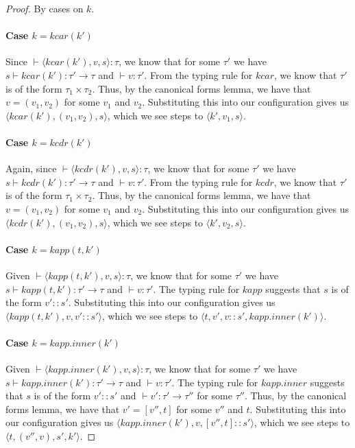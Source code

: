\documentclass{article}
\begin{document}
\begin{proof}
  By cases on $k$.

  \paragraph{Case $k = \mathit{kcar}(k')$} Since $\vdash \langle
  \mathit{kcar}(k'), v, s \rangle : \tau$, we know that for some
  $\tau'$ we have $s \vdash \mathit{kcar}(k') : \tau' \rightarrow
  \tau$ and $\vdash v : \tau'$. From the typing rule for
  $\mathit{kcar}$, we know that $\tau'$ is of the form $\tau_1 \times
  \tau_2$. Thus, by the canonical forms lemma, we have that $v = (v_1,
  v_2)$ for some $v_1$ and $v_2$. Substituting this into our
  configuration gives us $\langle \mathit{kcar}(k'), (v_1, v_2), s
  \rangle$, which we see steps to $\langle k', v_1, s \rangle$.

  \paragraph{Case $k = \mathit{kcdr}(k')$} Again, since $\vdash
  \langle \mathit{kcdr}(k'), v, s \rangle : \tau$, we know that for
  some $\tau'$ we have $s \vdash \mathit{kcdr}(k') : \tau' \rightarrow
  \tau$ and $\vdash v : \tau'$. From the typing rule for
  $\mathit{kcdr}$, we know that $\tau'$ is of the form $\tau_1 \times
  \tau_2$. Thus, by the canonical forms lemma, we have that $v = (v_1,
  v_2)$ for some $v_1$ and $v_2$. Substituting this into our
  configuration gives us $\langle \mathit{kcdr}(k'), (v_1, v_2), s
  \rangle$, which we see steps to $\langle k', v_2, s \rangle$.
  
  \paragraph{Case $k = \mathit{kapp}(t,k')$} Given $\vdash \langle
  \mathit{kapp}(t,k'), v, s \rangle : \tau$, we know that for some
  $\tau'$ we have $s \vdash \mathit{kapp}(t,k') : \tau' \rightarrow
  \tau$ and $\vdash v : \tau'$. The typing rule for $\mathit{kapp}$
  suggests that $s$ is of the form $v'::s'$. Substituting this into our
  configuration gives us $\langle \mathit{kapp}(t, k'), v, v'::s'
  \rangle$, which we see steps to $\langle t, v', v::s', kapp.inner(k')
  \rangle$.
  
  \paragraph{Case $k = \mathit{kapp.inner}(k')$} Given $\vdash \langle
  \mathit{kapp.inner}(k'), v, s \rangle : \tau$, we know that for some
  $\tau'$ we have $s \vdash \mathit{kapp.inner}(k') : \tau' \rightarrow
  \tau$ and $\vdash v : \tau'$. The typing rule for $\mathit{kapp.inner}$
  suggests that $s$ is of the form $v'::s'$ and $\vdash v' : \tau' \rightarrow
  \tau''$ for some $\tau''$. Thus, by the canonical forms lemma, we have that 
  $v' = [v'',t]$ for some $v''$ and $t$. Substituting this into our
  configuration gives us $\langle \mathit{kapp.inner}(k'), v, [v'',t]::s'
  \rangle$, which we see steps to $\langle t, (v'',v), s', k' \rangle$.


\end{proof}
\end{document}
